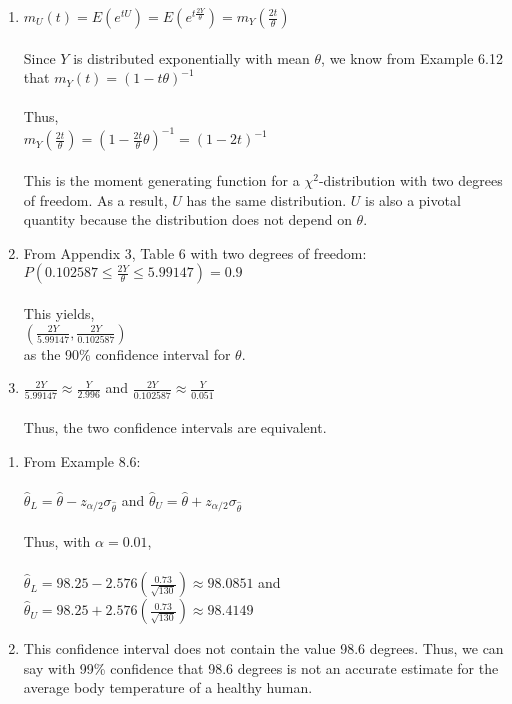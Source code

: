 \documentclass[12pt]{article}
\newenvironment{problem}[2][Problem]{\begin{trivlist}
\item[\hskip \labelsep {\bfseries #1}\hskip \labelsep {\bfseries #2.}]}{\end{trivlist}}
\begin{document}
\begin{enumerate}[label=\alph*)]
	\item $m_U(t) = E(e^{tU}) = E(e^{t\frac{2Y}{\theta}}) = m_Y(\frac{2t}{\theta})$\\
	\\
	Since $Y$ is distributed exponentially with mean $\theta$, we know from Example 6.12 that $m_Y(t) = (1 - t\theta)^{-1}$\\
	\\
	Thus,\\
	$m_Y(\frac{2t}{\theta}) = (1 - \frac{2t}{\theta}\theta)^{-1} = (1 - 2t)^{-1}$\\
	\\
	This is the moment generating function for a $\chi^2$-distribution with two degrees of freedom. As a result, $U$ has the same distribution. $U$ is also a pivotal quantity because the distribution does not depend on $\theta$.
	\item From Appendix 3, Table 6 with two degrees of freedom:\\
	$P(0.102587 \leq \frac{2Y}{\theta} \leq 5.99147) = 0.9$\\
	\\
	This yields,\\
	$(\frac{2Y}{5.99147}, \frac{2Y}{0.102587})$\\
	as the 90\% confidence interval for $\theta$.
	\item $\frac{2Y}{5.99147} \approx \frac{Y}{2.996}$ and $\frac{2Y}{0.102587} \approx \frac{Y}{0.051}$\\
	\\
	Thus, the two confidence intervals are equivalent.
\end{enumerate}

\begin{problem}{8.60}
\end{problem}

\begin{enumerate}[label=\alph*)]
	\item From Example 8.6:\\
	\\$\hat{\theta}_L = \hat{\theta} - z_{\alpha/2}\sigma_{\hat{\theta}}$ and $\hat{\theta}_U = \hat{\theta} + z_{\alpha/2}\sigma_{\hat{\theta}}$\\
	\\
	Thus, with $\alpha = 0.01$,\\
	\\
	$\hat{\theta}_L = 98.25 - 2.576(\frac{0.73}{\sqrt{130}}) \approx 98.0851$ and $\hat{\theta}_U = 98.25 + 2.576(\frac{0.73}{\sqrt{130}}) \approx 98.4149$
	\item This confidence interval does not contain the value 98.6 degrees. Thus, we can say with 99\% confidence that 98.6 degrees is not an accurate estimate for the average body temperature of a healthy human.
\end{enumerate}
\end{document}
